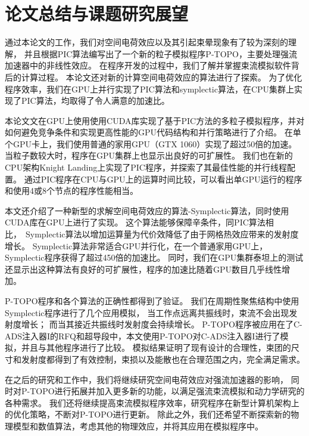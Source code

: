 
\chapter{论文总结与课题研究展望}
\label{chap:conclusion}
通过本论文的工作，我们对空间电荷效应以及其引起束晕现象有了较为深刻的理解，
并且根据PIC算法编写出了一个新的粒子模拟程序P-TOPO，主要处理强流加速器中的非线性效应。
在程序开发的过程中，我们了解并掌握束流模拟软件背后的计算过程。
本论文还对新的计算空间电荷效应的算法进行了探索。
为了优化程序效率，我们在GPU上并行实现了PIC算法和symplectic算法，在CPU集群上实现了PIC算法，均取得了令人满意的加速比。

本论文文在GPU上使用使用CUDA库实现了基于PIC方法的多粒子模拟程序，并对如何避免竞争条件和实现更高性能的GPU代码结构和并行策略进行了介绍。
在单个GPU卡上，我们使用普通的家用GPU（GTX 1060）实现了超过50倍的加速。
当粒子数较大时，程序在GPU集群上也显示出良好的可扩展性。
我们也在新的CPU架构Knight Landing上实现了PIC程序，并探索了其最佳性能的并行线程配置。
通过PIC程序在CPU与GPU上的运算时间比较，可以看出单GPU运行的程序和使用4或8个节点的程序性能相当。


本文还介绍了一种新型的求解空间电荷效应的算法-Symplectic算法，同时使用CUDA库在GPU上进行了实现。
这个算法能够保障辛条件，同PIC算法相比，~Symplectic算法以增加运算量为代价效降低了由于网格热效应带来的发射度增长。
Symplectic算法非常适合GPU并行化，在一个普通家用GPU上，Symplectic程序获得了超过450倍的加速比。
同时，我们在GPU集群泰坦上的测试还显示出这种算法有良好的可扩展性，程序的加速比随着GPU数目几乎线性增加。

P-TOPO程序和各个算法的正确性都得到了验证。
我们在周期性聚焦结构中使用Symplectic程序进行了几个应用模拟，
当工作点远离共振线时，束流不会出现发射度增长；
而当其接近共振线时发射度会持续增长。
P-TOPO程序被应用在了C-ADS注入器I的RFQ和超导段中，本文使用P-TOPO对C-ADS注入器I进行了模拟，并且与其他程序进行了比较。
模拟结果证明了现有设计的合理性，束团的尺寸和发射度都得到了有效控制，束损以及能散也在合理范围之内，完全满足需求。

在之后的研究和工作中，我们将继续研究空间电荷效应对强流加速器的影响，
同时对P-TOPO进行拓展并加入更多新的功能，以满足强流束流模拟和动力学研究的各种需求。
我们还将继续提高束流模拟程序效率，研究程序在新型计算机架构上的优化策略，不断对P-TOPO进行更新。
除此之外，我们还希望不断探索新的物理模型和数值算法，考虑其他的物理效应，并将其应用在模拟程序中。